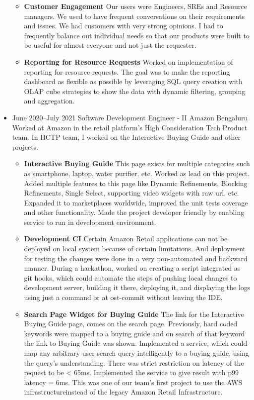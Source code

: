 \documentclass[11pt,a4paper,sans]{moderncv}
\begin{document}
\begin{itemize}
\begin {itemize}
      \vspace {2pt}
      \item
        \textbf {Customer Engagement}
        Our users were Engineers, SREs and Resource managers. We used to have frequent conversations on their requirements and issues. We had customers with very strong opinions. I had to frequently balance out individual needs so that our products were built to be useful for almost everyone and not just the requester.
      \item
      \vspace {2pt}
        \textbf {Reporting for Resource Requests}
        Worked on implementation of reporting for resource requests. The goal was to make the reporting dashboard as flexible as possible by leveraging SQL query creation with OLAP cube strategies to show the data with dynamic filtering, grouping and aggregation.
    \end {itemize}
    \vspace {6pt}
  \item
    \cventry
    {June 2020--July 2021}
    {Software Development Engineer - II}
    {Amazon}
    {Bengaluru}
    {}
    {}
    \vspace {5pt}
    Worked at Amazon in the retail platform's High Consideration Tech Product team. In HCTP team, I worked on the Interactive Buying Guide and other projects.
    \vspace {2pt}
    \begin {itemize}
      \item 
        \textbf{Interactive Buying Guide}
        This page exists for multiple categories such as smartphone, laptop, water purifier, etc. Worked as lead on this project. Added multiple features to this page like Dynamic Refinements, Blocking Refinements, Single Select, supporting video widgets with raw url, etc. Expanded it to marketplaces worldwide, improved the unit tests coverage and other functionality. Made the project developer friendly by enabling service to run in development environment.
        \vspace {2pt}
      \item 
        \textbf{Development CI}
        Certain Amazon Retail applications can not be deployed on local system because of certain limitations. And deployment for testing the changes were done in a very non-automated and backward manner. During a hackathon, worked on creating a script integrated as git hooks, which could automate the steps of pushing local changes to development server, building it there, deploying it, and displaying the logs using just a command or at ost-commit without leaving the IDE.
        \vspace {2pt}
      \item
        \textbf{Search Page Widget for Buying Guide}
        The link for the Interactive Buying Guide page, comes on the search page. Previously, hard coded keywords were mapped to a buying guide and on search of that keyword the link to Buying Guide was shown. Implemented a service, which could map any arbitrary user search query intelligently to a buying guide, using the query's understanding. There was strict restriction on latency of the request to be < 65ms. Implemented the service to give result with p99 latency = 6ms. This was one of our team's first project to use the AWS infrastructureinstead of the legacy Amazon Retail Infrastructure.

\end{itemize}
\end{itemize}
\end{document}
